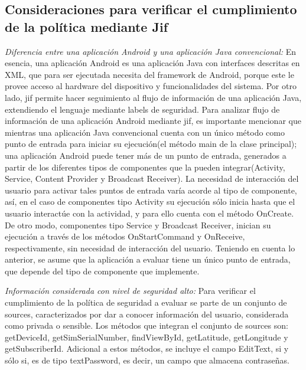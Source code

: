 \subsection{Consideraciones para verificar el cumplimiento de la política
mediante Jif} 
\textit{Diferencia entre una aplicación Android y una aplicación Java
convencional:}\newline 
En esencia, una aplicación Android es una aplicación Java con interfaces
descritas en XML, que para ser ejecutada necesita del framework de Android,
porque este le provee acceso al hardware del dispositivo y funcionalidades del
sistema.\newline 
Por otro lado, jif permite hacer seguimiento al flujo de información de una
aplicación Java, extendiendo el lenguaje mediante labels de seguridad.\newline
Para analizar flujo de información de una aplicación Android mediante
jif, es importante mencionar que mientras una aplicación Java convencional
cuenta con un único método como punto de entrada para iniciar su ejecución(el
método main de la clase principal); una aplicación Android puede tener más de un
punto de entrada, generados a partir de los diferentes tipos de componentes que
la pueden integrar(Activity, Service, Content Provider y Broadcast
Receiver). La necesidad de interacción del usuario para activar tales puntos de
entrada varía acorde al tipo de componente, así, en el caso de componentes tipo
Activity su ejecución sólo inicia hasta que el usuario interactúe con la
actividad, y para ello cuenta con el método OnCreate. De otro modo, componentes
tipo Service y Broadcast Receiver, inician su ejecución a través de los métodos
OnStartCommand y OnReceive, respectivamente, sin necesidad de interacción del
usuario.\newline 
{ \color{black} {Teniendo en cuenta lo anterior, se asume que la aplicación a
evaluar tiene un único punto de entrada, que depende del tipo de componente que
implemente.} }

\textit{Información considerada con nivel de seguridad alto:}\newline
Para verificar el cumplimiento de la política de seguridad a evaluar se parte de
un conjunto de sources, caracterizados por dar a conocer información del
usuario, considerada como privada o sensible. Los métodos que integran el
conjunto de sources son: getDeviceId, getSimSerialNumber, findViewById,
getLatitude, getLongitude y getSubscriberId. Adicional a estos métodos, se
incluye el campo EditText, si y sólo si, es de tipo textPassword, es decir, un
campo que almacena contraseñas.

